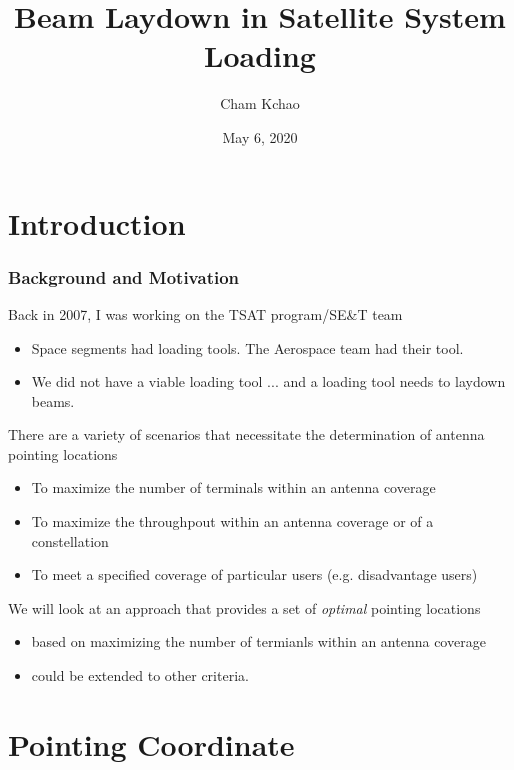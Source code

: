 \documentclass[aspectratio=169]{beamer}
\title{Beam Laydown in Satellite System Loading}
\institute{Copiam}
\author{Cham Kchao}
\date{May 6, 2020}
\begin{document}
\addtocounter{framenumber}{1}
\maketitle

\section{Introduction}
\begin{frame}
\frametitle{Background and Motivation}
Back in 2007, I was working on the TSAT program/SE\&T team
\begin{itemize}
\item Space segments had loading tools.  The Aerospace team had their tool.
\item We did not have a viable loading tool ... and a loading tool needs to laydown beams.
\end{itemize}
There are a variety of scenarios that necessitate the determination of antenna pointing locations
\begin{itemize}
\item To maximize the number of terminals within an antenna coverage

\item To maximize the throughpout within an antenna coverage or of a constellation
\item To meet a specified coverage of particular users (e.g. disadvantage users)
\end{itemize}
We will look at an approach that provides a set of {\em optimal} pointing locations
\begin{itemize}
\item based on maximizing the number of termianls within an antenna coverage
\item could be extended to other criteria.
\end{itemize}
\end{frame}

\section{Pointing Coordinate}
\end{document}
